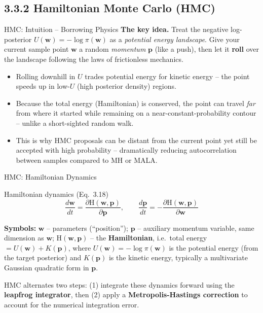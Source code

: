 \documentclass[aspectratio=169,10pt]{beamer}
\newcommand{\bw}{\mathbf{w}}
\newcommand{\bp}{\mathbf{p}}
\newcommand{\Ham}{\mathrm{H}}
\begin{document}
\subsection{3.3.2 Hamiltonian Monte Carlo (HMC)}

\begin{frame}{HMC: Intuition -- Borrowing Physics}
  \textbf{The key idea.} Treat the negative log-posterior $U(\bw) = -\log \pi(\bw)$
  as a \emph{potential energy landscape}. Give your current sample point
  $\bw$ a random \emph{momentum} $\bp$ (like a push), then let it \textbf{roll}
  over the landscape following the laws of frictionless mechanics.

  \vspace{2mm}
  \begin{itemize}
    \item Rolling downhill in $U$ trades potential energy for kinetic energy
      -- the point speeds up in low-$U$ (high posterior density) regions.
    \item Because the total energy (Hamiltonian) is conserved, the point can
      travel \emph{far} from where it started while remaining on a
      near-constant-probability contour -- unlike a short-sighted random walk.
    \item This is why HMC proposals can be distant from the current point yet
      still be accepted with high probability -- dramatically reducing
      autocorrelation between samples compared to MH or MALA.
  \end{itemize}
\end{frame}

\begin{frame}{HMC: Hamiltonian Dynamics}
  \begin{block}{Hamiltonian dynamics (Eq.~3.18)}
  \begin{equation}
    \frac{d\bw}{dt} = \frac{\partial \Ham(\bw,\bp)}{\partial \bp}, \qquad
    \frac{d\bp}{dt} = -\frac{\partial \Ham(\bw,\bp)}{\partial \bw}
  \end{equation}
  \end{block}
  \textbf{Symbols:} $\bw$ -- parameters (``position''); $\bp$ -- auxiliary
  momentum variable, same dimension as $\bw$; $\Ham(\bw,\bp)$ -- the
  \textbf{Hamiltonian}, i.e.\ total energy $= U(\bw) + K(\bp)$, where
  $U(\bw)=-\log\pi(\bw)$ is the potential energy (from the target posterior)
  and $K(\bp)$ is the kinetic energy, typically a multivariate Gaussian
  quadratic form in $\bp$.

  \vspace{2mm}
  HMC alternates two steps: (1) integrate these dynamics forward using the
  \textbf{leapfrog integrator}, then (2) apply a \textbf{Metropolis-Hastings
  correction} to account for the numerical integration error.
\end{frame}
\end{document}
